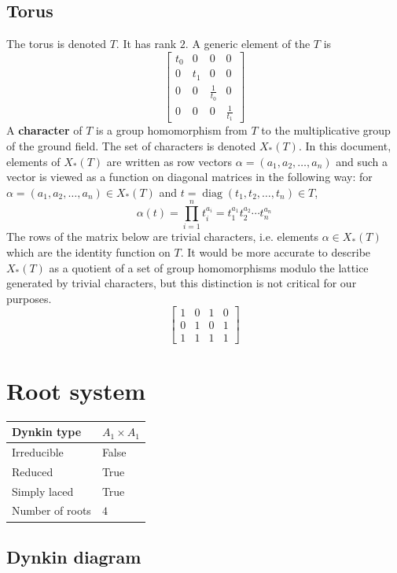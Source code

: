 \documentclass[11pt]{article}
\newcommand{\tbf}{\textbf}
\DeclareMathOperator{\diag}{diag}
\theoremstyle{definition}
\begin{document}
\subsection{Torus}

The torus is denoted $T$. It has rank $2$. A generic element of the $T$ is
\[
\left[\begin{matrix}t_{0} & 0 & 0 & 0\\0 & t_{1} & 0 & 0\\0 & 0 & \frac{1}{t_{0}} & 0\\0 & 0 & 0 & \frac{1}{t_{1}}\end{matrix}\right]
\]
A \tbf{character} of $T$ is a group homomorphism from $T$ to the multiplicative group of the ground field. The set of characters is denoted $X_*(T)$. In this document, elements of $X_*(T)$ are written as row vectors $\alpha = (a_1, a_2, \ldots, a_n)$ and such a vector is viewed as a function on diagonal matrices in the following way: for $\alpha = (a_1, a_2, \ldots, a_n) \in X_*(T)$ and $t = \diag(t_1, t_2, \ldots, t_n) \in T$, 
\[
	\alpha(t) = \prod_{i=1}^n t_i^{a_i} = t_1^{a_1} t_2^{a_2} \cdots t_n^{a_n}
\]
The rows of the matrix below are trivial characters, i.e. elements $\alpha \in X_*(T)$ which are the identity function on $T$. It would be more accurate to describe $X_*(T)$ as a quotient of a set of group homomorphisms modulo the lattice generated by trivial characters, but this distinction is not critical for our purposes.
\[
\left[\begin{matrix}1 & 0 & 1 & 0\\0 & 1 & 0 & 1\\1 & 1 & 1 & 1\end{matrix}\right]
\]

\newpage
\section{Root system}

\begin{tabular}{|l|l|}
	\hline
    Dynkin type & $A_1 \times A_1$ \\
	\hline
    Irreducible & False \\
	\hline
    Reduced & True \\
	\hline
	Simply laced & True \\
	\hline
	Number of roots & $4$ \\
	\hline
\end{tabular}

\subsection{Dynkin diagram}
\end{document}
